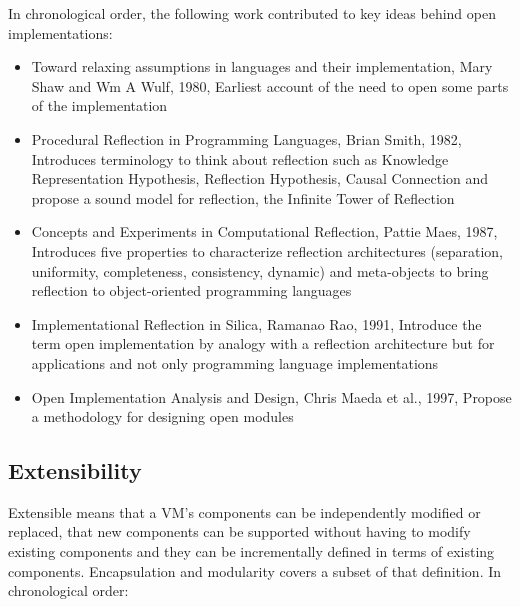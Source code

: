 In chronological order, the following work contributed to key ideas behind open
implementations:
\begin{itemize}
    \item Toward relaxing assumptions in languages and their implementation,
        Mary Shaw and Wm A Wulf, 1980, Earliest account of the need to open
        some parts of the implementation
    \item Procedural Reflection in Programming Languages, Brian Smith, 1982,
        Introduces terminology to think about reflection such as Knowledge
        Representation Hypothesis, Reflection Hypothesis, Causal Connection and
        propose a sound model for reflection, the Infinite Tower of Reflection
    \item Concepts and Experiments in Computational Reflection, Pattie Maes,
        1987, Introduces five properties to characterize reflection
        architectures (separation, uniformity, completeness, consistency,
        dynamic) and meta-objects to bring reflection to object-oriented
        programming languages 
    \item Implementational Reflection in Silica, Ramanao Rao, 1991, Introduce
        the term open implementation by analogy with a reflection architecture
        but for applications and not only programming language implementations
    \item Open Implementation Analysis and Design, Chris Maeda et al., 1997,
        Propose a methodology for designing open modules
\end{itemize}


\subsection{Extensibility}

Extensible means that a VM's components can be independently modified or
replaced, that new components can be supported without having to modify
existing components and they can be incrementally defined in terms of existing
components. Encapsulation and modularity covers a subset of that definition. In
chronological order:

